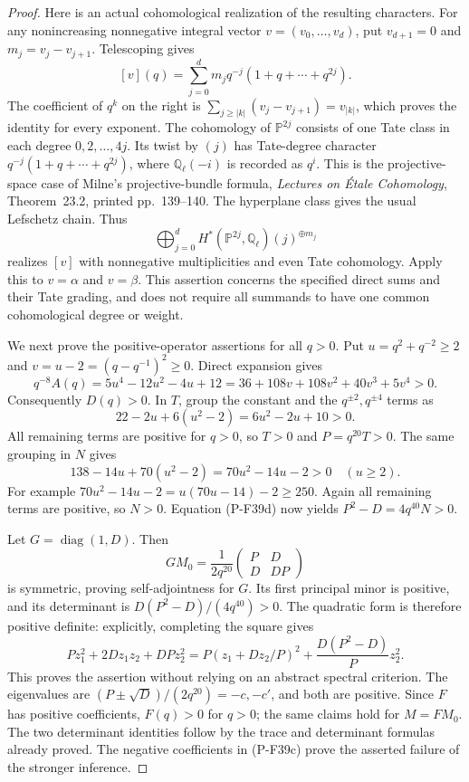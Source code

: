 \documentclass[11pt,a4paper]{article}
\begin{document}
\begin{proof}
Here is an actual cohomological realization of the resulting
characters. For any nonincreasing nonnegative integral vector
$v=(v_0,\ldots,v_d)$, put $v_{d+1}=0$ and
$m_j=v_j-v_{j+1}$. Telescoping gives
\[
 [v](q)=\sum_{j=0}^d m_j q^{-j}(1+q+\cdots+q^{2j}).
 \tag{P-F39h}
\]
The coefficient of $q^k$ on the right is
$\sum_{j\ge|k|}(v_j-v_{j+1})=v_{|k|}$, which proves
the identity for every exponent. The cohomology of
$\mathbb P^{2j}$ consists of one Tate class in each degree
$0,2,\ldots,4j$. Its twist by $(j)$ has Tate-degree
character $q^{-j}(1+q+\cdots+q^{2j})$, where
$\mathbb Q_\ell(-i)$ is recorded as $q^i$.
This is the projective-space case of Milne's projective-bundle
formula, \emph{Lectures on \'{E}tale Cohomology}, Theorem~23.2,
printed pp.~139--140. The hyperplane class gives the usual
Lefschetz chain. Thus
\[
       \bigoplus_{j=0}^d
       H^*(\mathbb P^{2j},\mathbb Q_\ell)(j)^{\oplus m_j}
 \tag{P-F39i}
\]
realizes $[v]$ with nonnegative multiplicities and even Tate
cohomology. Apply this to $v=\alpha$ and $v=\beta$.
This assertion concerns the specified direct sums and their
Tate grading, and does not require all summands to have one
common cohomological degree or weight.

We next prove the positive-operator assertions for all $q>0$.
Put $u=q^2+q^{-2}\ge2$ and $v=u-2=(q-q^{-1})^2\ge0$.
Direct expansion gives
\[
 q^{-8}A(q)=5u^4-12u^2-4u+12
          =36+108v+108v^2+40v^3+5v^4>0.
 \tag{P-F39n}
\]
Consequently $D(q)>0$. In $T$, group the constant and the
$q^{\pm2},q^{\pm4}$ terms as
\[
             22-2u+6(u^2-2)=6u^2-2u+10>0.
\]
All remaining terms are positive for $q>0$, so $T>0$ and
$P=q^{20}T>0$. The same grouping in $N$ gives
\[
             138-14u+70(u^2-2)=70u^2-14u-2>0
                         \quad(u\ge2).
\]
For example $70u^2-14u-2=u(70u-14)-2\ge250$.
Again all remaining terms are positive, so $N>0$.
Equation (P-F39d) now yields $P^2-D=4q^{40}N>0$.

Let $G=\operatorname{diag}(1,D)$. Then
\[
       GM_0=\frac1{2q^{20}}
          \begin{pmatrix}P&D\\D&DP\end{pmatrix}
\]
is symmetric, proving self-adjointness for $G$.
Its first principal minor is positive, and its determinant
is $D(P^2-D)/(4q^{40})>0$. The quadratic form is therefore
positive definite: explicitly, completing the square gives
\[
 P z_1^2+2D z_1z_2+DPz_2^2
   =P(z_1+D z_2/P)^2+\frac{D(P^2-D)}Pz_2^2.
\]
This proves the assertion without relying on an abstract
spectral criterion. The eigenvalues are
$(P\pm\sqrt D)/(2q^{20})=-c,-c'$, and both are positive.
Since $F$ has positive coefficients, $F(q)>0$ for $q>0$;
the same claims hold for $M=FM_0$. The two determinant
identities follow by the trace and determinant formulas
already proved. The negative coefficients in (P-F39c)
prove the asserted failure of the stronger inference.


\end{proof}
\end{document}
